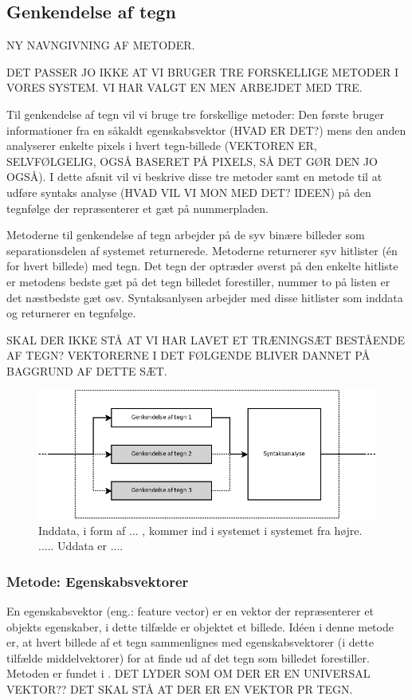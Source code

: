 \subsection{Genkendelse af tegn}

NY NAVNGIVNING AF METODER.

\label{sec_monster}
DET PASSER JO IKKE AT VI BRUGER TRE FORSKELLIGE METODER I VORES SYSTEM. VI HAR VALGT EN MEN ARBEJDET MED TRE.

Til genkendelse af tegn vil vi bruge tre forskellige metoder: Den første bruger informationer fra en såkaldt egenskabsvektor (HVAD ER DET?) mens den anden analyserer enkelte pixels i hvert tegn-billede (VEKTOREN ER, SELVFØLGELIG, OGSÅ BASERET PÅ PIXELS, SÅ DET GØR DEN JO OGSÅ). I dette afsnit vil vi beskrive disse tre metoder samt en metode til at udføre syntaks analyse (HVAD VIL VI MON MED DET? IDEEN) på den tegnfølge der repræsenterer et gæt på nummerpladen.

Metoderne til genkendelse af tegn arbejder på de syv binære billeder som separationsdelen af systemet returnerede. Metoderne returnerer syv hitlister (én for hvert billede) med tegn. Det tegn der optræder øverst på den enkelte hitliste er metodens bedste gæt på det tegn billedet forestiller, nummer to på listen er det næstbedste gæt osv. Syntaksanlysen arbejder med disse hitlister som inddata og returnerer en tegnfølge.

SKAL DER IKKE STÅ AT VI HAR LAVET ET TRÆNINGSÆT BESTÅENDE AF TEGN? VEKTORERNE I DET FØLGENDE BLIVER DANNET PÅ BAGGRUND AF DETTE SÆT.

\begin{figure}[htp]
\centering
\includegraphics[width=12cm]{system/illu/dia_trin3.png} 
\caption{Inddata, i form af ... , kommer ind i systemet i systemet fra højre. ..... Uddata er ....}
\label{fig:dia_trin3}
\end{figure}

\subsubsection{Metode: Egenskabsvektorer}
En egenskabsvektor (eng.: feature vector) er en vektor der repræsenterer et objekts egenskaber, i dette tilfælde er objektet et billede. Idéen i denne metode er, at hvert billede af et tegn sammenlignes med egenskabsvektorer (i dette tilfælde middelvektorer) for at finde ud af det tegn som billedet forestiller. Metoden er fundet i \cite{arth}. DET LYDER SOM OM DER ER EN UNIVERSAL VEKTOR?? DET SKAL STÅ AT DER ER EN VEKTOR PR TEGN.

